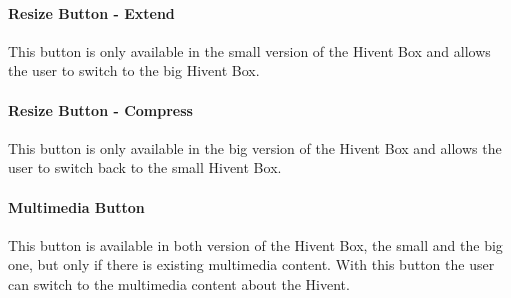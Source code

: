 \paragraph{Resize Button - Extend} %
This button is only available in the small version of the Hivent Box and allows the user to switch to the big Hivent Box. 
\paragraph{Resize Button - Compress} %
This button is only available in the big version of the Hivent Box and allows the user to switch back to the small Hivent Box.
\paragraph{Multimedia Button} %
This button is available in both version of the Hivent Box, the small and the big one, but only if there is existing multimedia content. With this button the user can switch to the multimedia content about the Hivent.

